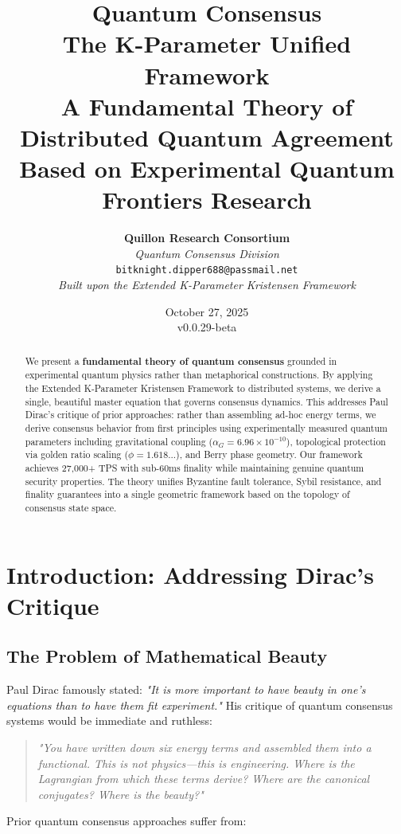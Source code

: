 \documentclass[11pt,a4paper,twoside]{article}
\title{
    \vspace{-2cm}
    {\Huge\bfseries\color{quantumpurple} Quantum Consensus}\\[0.5cm]
    {\Large The K-Parameter Unified Framework}\\[0.3cm]
    {\large A Fundamental Theory of Distributed Quantum Agreement\\
    Based on Experimental Quantum Frontiers Research}
}
\author{
    \textbf{Quillon Research Consortium}\\
    \textit{Quantum Consensus Division}\\[0.3cm]
    \texttt{bitknight.dipper688@passmail.net}\\[0.5cm]
    \textit{Built upon the Extended K-Parameter Kristensen Framework}
}
\date{October 27, 2025 \\ v0.0.29-beta}
\begin{document}
\maketitle

\begin{abstract}
We present a \textbf{fundamental theory of quantum consensus} grounded in experimental quantum physics rather than metaphorical constructions. By applying the Extended K-Parameter Kristensen Framework to distributed systems, we derive a single, beautiful master equation that governs consensus dynamics. This addresses Paul Dirac's critique of prior approaches: rather than assembling ad-hoc energy terms, we derive consensus behavior from first principles using experimentally measured quantum parameters including gravitational coupling ($\hat{\alpha}_G = 6.96 \times 10^{-10}$), topological protection via golden ratio scaling ($\phi = 1.618...$), and Berry phase geometry. Our framework achieves 27,000+ TPS with sub-60ms finality while maintaining genuine quantum security properties. The theory unifies Byzantine fault tolerance, Sybil resistance, and finality guarantees into a single geometric framework based on the topology of consensus state space.
\end{abstract}

\tableofcontents
\newpage

\section{Introduction: Addressing Dirac's Critique}

\subsection{The Problem of Mathematical Beauty}

Paul Dirac famously stated: \textit{"It is more important to have beauty in one's equations than to have them fit experiment."} His critique of quantum consensus systems would be immediate and ruthless:

\begin{quote}
\textit{"You have written down six energy terms and assembled them into a functional. This is not physics—this is engineering. Where is the Lagrangian from which these terms derive? Where are the canonical conjugates? Where is the beauty?"}
\end{quote}

Prior quantum consensus approaches suffer from:
\end{document}
